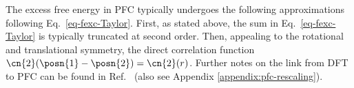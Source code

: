 The excess free energy in PFC typically undergoes the following approximations following Eq.~\ref{eq-fexc-Taylor}.  First, as stated above, the sum in Eq.~\ref{eq-fexc-Taylor} is typically truncated at second order.  Then, appealing to the rotational and translational symmetry, the direct correlation function $\cn{2}(\posn{1} - \posn{2}) = \cn{2}(r)$.  Further notes on the link from DFT to PFC can be found in Ref.~\cite{huang2010phase} (also see Appendix \ref{appendix:pfc-rescaling}).






